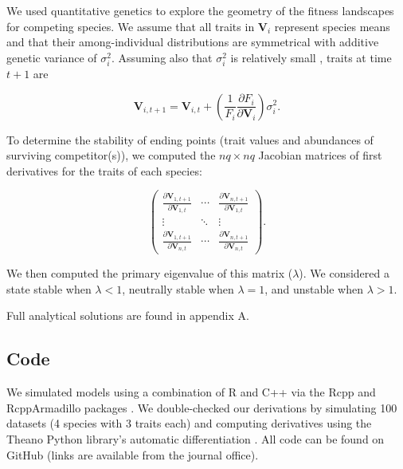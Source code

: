 We used quantitative genetics to explore the geometry of the fitness landscapes for
competing species.
We assume that all traits in $\mathbf{V}_i$ represent species means and that their
among-individual distributions are symmetrical with additive genetic variance
of $\sigma^2_i$.
Assuming also that $\sigma^2_i$ is relatively small
\citep{Iwasa:1991eo,Abrams:2001va,Abrams:1993cr}, traits at time $t+1$ are

\begin{equation} \label{eq:trait-change}
    \mathbf{V}_{i,t+1} = \mathbf{V}_{i,t} + \left( \frac{1}{F_i}
        \frac{\partial F_i}{\partial \mathbf{V}_{i}} \right) \sigma^2_i
    \textrm{.}
\end{equation}


To determine the stability of ending points (trait values and abundances of surviving
competitor(s)), we computed the $nq \times nq$ Jacobian matrices of first derivatives
for the traits of each species:

\begin{equation} \label{eq:jacobian}
    \begin{pmatrix}
        \frac{\partial \mathbf{V}_{1,t+1}}{\partial \mathbf{V}_{1,t}} & \cdots &
            \frac{\partial \mathbf{V}_{n,t+1}}{\partial \mathbf{V}_{1,t}} \\
        \vdots & \ddots & \vdots \\
        \frac{\partial \mathbf{V}_{1,t+1}}{\partial \mathbf{V}_{n,t}} & \cdots &
            \frac{\partial \mathbf{V}_{n,t+1}}{\partial \mathbf{V}_{n,t}}
    \end{pmatrix}
    \textrm{.}
\end{equation}

\noindent We then computed the primary eigenvalue of this matrix ($\lambda$).
We considered a state stable when $\lambda < 1$,
neutrally stable when $\lambda = 1$,
and unstable when $\lambda > 1$.

Full analytical solutions are found in appendix A.


\subsection*{Code}

We simulated models using a combination of R \citep{RCoreTeam:2019wf} and
C++ via the Rcpp and RcppArmadillo packages
\citep{Eddelbuettel:2014ad,Eddelbuettel:2013if,Sanderson:2016cs}.
We double-checked our derivations by simulating 100 datasets
(4 species with 3 traits each) and computing derivatives using the Theano Python
library's automatic differentiation \citep{TheanoDevelopmentTeam:2016uc}.
All code can be found on GitHub
(links are available from the journal office).

